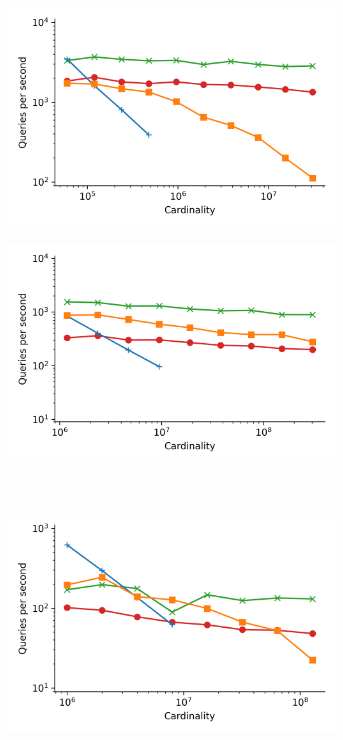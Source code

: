 \begin{figure}
    \begin{subfigure}[b]{0.47\textwidth}
        \includegraphics[width=0.95\textwidth]{plots/fashion-mnist_PermutedBall_10_throughput.png}
        \label{fig:results:fashion-mnist-scaling}
    \end{subfigure}%
    \begin{subfigure}[b]{0.47\textwidth}
        \includegraphics[width=0.95\textwidth]{plots/glove-25_PermutedBall_10_throughput.png}
        \label{fig:results:glove-25-scaling}
    \end{subfigure}%
    \\
    \begin{subfigure}[b]{0.47\textwidth}
        \includegraphics[width=0.95\textwidth]{plots/sift_PermutedBall_10_throughput.png}

\end{subfigure}
\end{figure}

